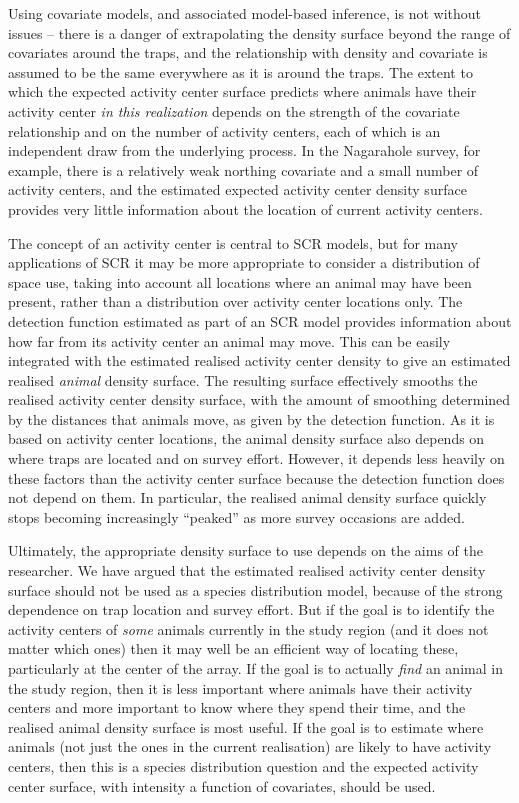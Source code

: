\documentclass[10pt,a4paper]{article}
\begin{document}
Using covariate models, and associated model-based inference, is not without issues -- there is a danger of extrapolating the density surface beyond the range of covariates around the traps, and the relationship with density and covariate is assumed to be the same everywhere as it is around the traps. The extent to which the expected activity center surface predicts where animals have their activity center {\it in this realization} depends on the strength of the covariate relationship and on the number of activity centers, each of which is an independent draw from the underlying process. In the Nagarahole survey, for example, there is a relatively weak northing covariate and a small number of activity centers, and the estimated expected activity center density surface provides very little information about the location of current activity centers. 

The concept of an activity center is central to SCR models, but for many applications of SCR it may be more appropriate to consider a distribution of space use, taking into account all locations where an animal may have been present, rather than a distribution over activity center locations only. The detection function estimated as part of an SCR model provides information about how far from its activity center an animal may move. This can be easily integrated with the estimated realised activity center density to give an estimated realised {\it animal} density surface. The resulting surface effectively smooths the realised activity center density surface, with the amount of smoothing determined by the distances that animals move, as given by the detection function. As it is based on activity center locations, the animal density surface also depends on where traps are located and on survey effort. However, it depends less heavily on these factors than the activity center surface because the detection function does not depend on them. In particular, the realised animal density surface quickly stops becoming increasingly ``peaked'' as more survey occasions are added.

Ultimately, the appropriate density surface to use depends on the aims of the researcher. We have argued that the estimated realised activity center density surface should not be used as a species distribution model, because of the strong dependence on trap location and survey effort. But if the goal is to identify the activity centers of {\it some} animals currently in the study region (and it does not matter which ones) then it may well be an efficient way of locating these, particularly at the center of the array. If the goal is to actually {\it find} an animal in the study region, then it is less important where animals have their activity centers and more important to know where they spend their time, and the realised animal density surface is most useful. If the goal is to estimate where animals (not just the ones in the current realisation) are likely to have activity centers, then this is a species distribution question and the expected activity center surface, with intensity a function of covariates, should be used.
\end{document}

